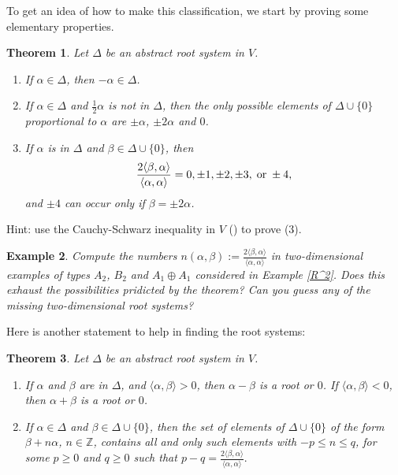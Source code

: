 \documentclass[11pt]{amsart}
\newcommand{\Z}{\mathbb Z}
\newcommand{\la}{\langle}
\newcommand{\ra}{\rangle}
\newtheorem{theorem}{Theorem}
\newtheorem{example}[theorem]{Example}
\begin{document}
To get an idea of how to make this classification, we start by 
proving some elementary properties. 

\begin{theorem} \label{r1}
Let $\Delta$ be an abstract root system in $V$. 
\begin{enumerate} 
\item{If $\alpha \in \Delta$, then $-\alpha \in \Delta$.}
\item{If $\alpha \in \Delta$ and $\frac{1}{2}\alpha$ is not in $\Delta$, 
then the only possible elements of $\Delta \cup \{0\}$ proportional to 
$\alpha$ are $\pm \alpha$, $\pm 2 \alpha$ and $0$. } 
\item{If $\alpha$ is in $\Delta$ and $\beta \in \Delta \cup \{0\}$, 
then 
$$ \frac{2\la \beta, \alpha\ra}{\la \alpha, \alpha \ra } = 
0, \pm1, \pm2, \pm 3, \; {\rm or}\; \pm 4 , $$
and $\pm 4$ can occur only if $\beta = \pm 2 \alpha$. } 
\end{enumerate} 
\end{theorem} 
Hint: use the Cauchy-Schwarz inequality in $V$ (\cite{1}) to prove (3). 
 
\begin{example} Compute the numbers 
$n(\alpha, \beta) := 
\frac{2\la \beta, \alpha\ra}{\la \alpha, \alpha \ra }$ in two-dimensional 
examples of types $A_2$, $B_2$ and $A_1 \oplus A_1$ considered in Example 
\ref{R^2}. 
Does this exhaust the possibilities pridicted by the theorem? Can you guess 
any of the missing two-dimensional root systems?    
\end{example} 

Here is another statement to help in finding the root systems: 

\begin{theorem} Let $\Delta$ be an abstract root system in $V$. 
\begin{enumerate} 
\item{If $\alpha$ and $\beta$ are in $\Delta$, and 
$\la \alpha, \beta \ra >0$, then $\alpha - \beta$ is a root or $0$. 
If  $\la \alpha, \beta \ra <0$, then $\alpha + \beta$ is a root or $0$. }
\item{If $\alpha \in \Delta$ and $\beta \in \Delta \cup \{0\}$, 
then the set of elements of $\Delta \cup \{0\}$ of the form 
$\beta + n \alpha$, $ n \in \Z$,  contains all and only such elements with 
$-p \leq n \leq q$, for some $p \geq 0$ and $q \geq 0$ such that
$p-q = \frac{2 \la \beta, \alpha \ra}{\la \alpha, \alpha \ra}.$ } 
\end{enumerate} 
\end{theorem} 
\end{document}

